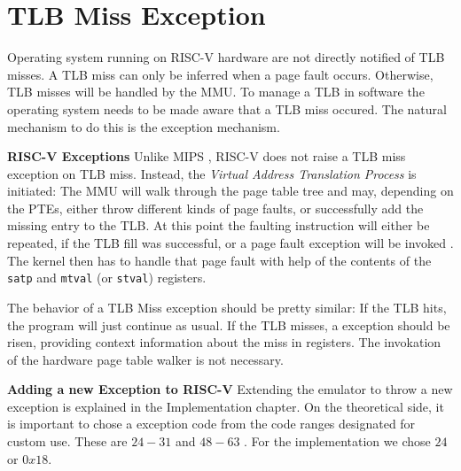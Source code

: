 \section{TLB Miss Exception}
Operating system running on RISC-V hardware are not directly notified of TLB misses.
A TLB miss can only be inferred when a page fault occurs. Otherwise, TLB misses will be handled
by the MMU.
To manage a TLB in software the operating system needs to be made aware that a TLB miss occured.
The natural mechanism to do this is the exception mechanism.

\textbf{RISC-V Exceptions}
Unlike MIPS \cite{heiserAnatomyHighPerformanceMicrokernel}, RISC-V does not raise a TLB miss exception on TLB miss.
Instead, the \emph{Virtual Address Translation Process} is initiated: The MMU will walk through
the page table tree and may, depending on the PTEs, either throw different kinds of page faults, or
successfully add the missing entry to the TLB.
At this point the faulting instruction will either be repeated, if the TLB fill was successful, or
a page fault exception will be invoked \cite{RISCVInstructionSet}. The kernel then has to handle that page fault with help
of the contents of the \texttt{satp} and \texttt{mtval} (or \texttt{stval}) registers.

The behavior of a TLB Miss exception should be pretty similar: If the TLB hits, the program will
just continue as usual. If the TLB misses, a exception should be risen, providing context
information about the miss in registers. The invokation of the hardware page table walker is
not necessary.


\textbf{Adding a new Exception to RISC-V}
Extending the emulator to throw a new exception is explained in the Implementation chapter.
On the theoretical side, it is important to chose a exception code from the code ranges designated
for custom use. These are $24-31$ and $48-63$ \cite{RISCVInstructionSet}. For the implementation we chose $24$ or $0x18$.



